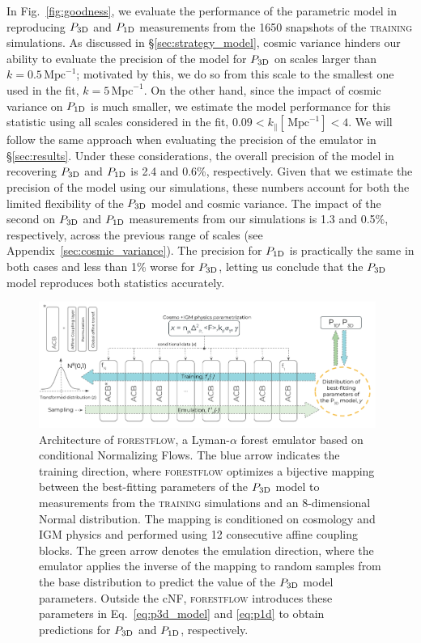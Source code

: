 \documentclass[fleqn,usenatbib]{mnras}
\newcommand{\lyaf}{Lyman-$\alpha$ forest\xspace}
\newcommand{\poned}{\ensuremath{P_{\rm 1D}}\xspace}
\newcommand{\pthreed}{\ensuremath{P_{\rm 3D}}\xspace}
\newcommand{\forestflow}{\textsc{forestflow}\xspace}
\newcommand{\lacehc}{\textsc{training}\xspace}
\newcommand{\iMpc}{\ensuremath{\,\mathrm{Mpc}^{-1}}}
\begin{document}
In Fig.~\ref{fig:goodness}, we evaluate the performance of the parametric model in reproducing \pthreed and \poned measurements from the 1650 snapshots of the \lacehc simulations. As discussed in \S\ref{sec:strategy_model}, cosmic variance hinders our ability to evaluate the precision of the model for \pthreed on scales larger than $k=0.5\iMpc$; motivated by this, we do so from this scale to the smallest one used in the fit, $k=5\iMpc$. On the other hand, since the impact of cosmic variance on \poned is much smaller, we estimate the model performance for this statistic using all scales considered in the fit, $0.09<k_\parallel[\iMpc]<4$. We will follow the same approach when evaluating the precision of the emulator in \S\ref{sec:results}. Under these considerations, the overall precision of the model in recovering \pthreed and \poned is 2.4 and 0.6\%, respectively. Given that we estimate the precision of the model using our simulations, these numbers account for both the limited flexibility of the \pthreed model and cosmic variance. The impact of the second on \pthreed and \poned measurements from our simulations is 1.3 and 0.5\%, respectively, across the previous range of scales (see Appendix~\ref{sec:cosmic_variance}). The precision for \poned is practically the same in both cases and less than 1\% worse for \pthreed, letting us conclude that the \pthreed model reproduces both statistics accurately.


\begin{figure}
    \includegraphics[width= 0.98\textwidth]{figures/network_architecture.png} 
    \centering
    \caption{Architecture of \forestflow, a \lyaf emulator based on conditional Normalizing Flows. The blue arrow indicates the training direction, where \forestflow optimizes a bijective mapping between the best-fitting parameters of the \pthreed model to measurements from the \lacehc simulations and an 8-dimensional Normal distribution. The mapping is conditioned on cosmology and IGM physics and performed using 12 consecutive affine coupling blocks. The green arrow denotes the emulation direction, where the emulator applies the inverse of the mapping to random samples from the base distribution to predict the value of the \pthreed model parameters. Outside the cNF, \forestflow introduces these parameters in Eq.~\ref{eq:p3d_model} and \ref{eq:p1d} to obtain predictions for \pthreed and \poned, respectively.}
    \label{fig:net_architecture}
 \end{figure}
\end{document}
